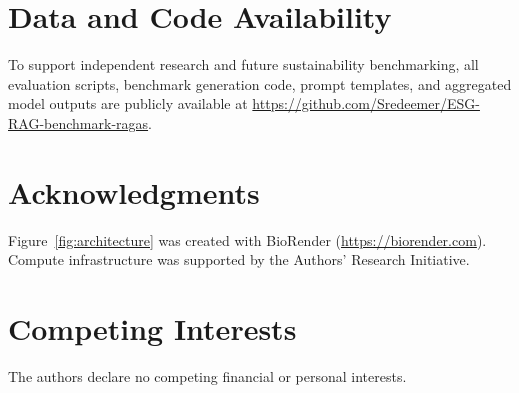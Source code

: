\documentclass[11pt,letterpaper]{article}
\begin{document}
\section*{Data and Code Availability}
To support independent research and future sustainability benchmarking, all evaluation scripts, benchmark generation code, prompt templates, and aggregated model outputs are publicly available at \url{https://github.com/Sredeemer/ESG-RAG-benchmark-ragas}.

\section*{Acknowledgments}
Figure~\ref{fig:architecture} was created with BioRender (\url{https://biorender.com}). Compute infrastructure was supported by the Authors' Research Initiative.

\section*{Competing Interests}
The authors declare no competing financial or personal interests.



\end{document}

